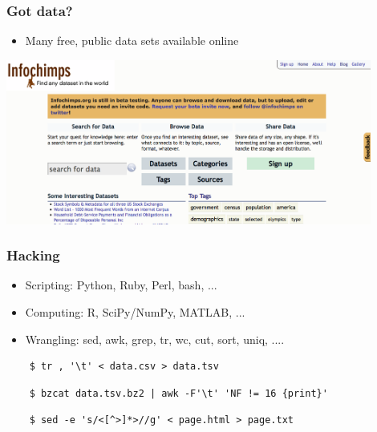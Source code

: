 \documentclass[xcolor=dvipsnames, 9pt]{beamer}
\begin{document}
\begin{frame}
  \frametitle{Got data?}

  \begin{itemize}
    \item Many free, public data sets available online
  \end{itemize}

    \begin{center}
      \includegraphics[width=0.9\textwidth]{infochimps.png}
    \end{center}

\end{frame}

\begin{frame}[fragile]
  \frametitle{Hacking}

  \begin{itemize}
    \item Scripting: Python, Ruby, Perl, bash, ...
    \item Computing: R, SciPy/NumPy, MATLAB, ...
    \item Wrangling: sed, awk, grep, tr, wc, cut, sort, uniq, ....
  \end{itemize}

  \begin{verbatim}
    $ tr , '\t' < data.csv > data.tsv
  \end{verbatim}

  \begin{verbatim}
    $ bzcat data.tsv.bz2 | awk -F'\t' 'NF != 16 {print}'
  \end{verbatim}

  \begin{verbatim}
    $ sed -e 's/<[^>]*>//g' < page.html > page.txt
  \end{verbatim}


\end{frame}

\end{document}
